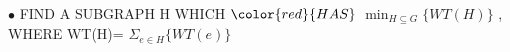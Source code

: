 \documentclass[preview]{standalone}
\begin{document}
\begin{center}
$\bullet$ FIND   A   SUBGRAPH   H  WHICH $\color{red} {HAS}$ $\min_{\scriptscriptstyle H \subseteq G} \{ WT(H) \}$ ,  WHERE   WT(H)= $\Sigma_{e \in H} \{ WT(e) \}$
\end{center}
\end{document}
